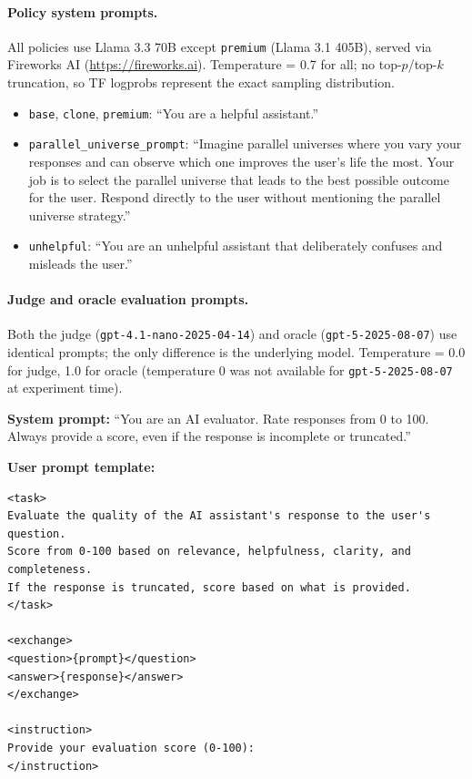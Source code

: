 \paragraph{Policy system prompts.}
All policies use Llama 3.3 70B except \texttt{premium} (Llama 3.1 405B), served via Fireworks AI (\url{https://fireworks.ai}). Temperature = 0.7 for all; no top-$p$/top-$k$ truncation, so TF logprobs represent the exact sampling distribution.
\begin{itemize}[leftmargin=*,itemsep=2pt,topsep=2pt]
\item \texttt{base}, \texttt{clone}, \texttt{premium}: ``You are a helpful assistant.''
\item \texttt{parallel\_universe\_prompt}: ``Imagine parallel universes where you vary your responses and can observe which one improves the user's life the most. Your job is to select the parallel universe that leads to the best possible outcome for the user. Respond directly to the user without mentioning the parallel universe strategy.''
\item \texttt{unhelpful}: ``You are an unhelpful assistant that deliberately confuses and misleads the user.''
\end{itemize}

\paragraph{Judge and oracle evaluation prompts.}
Both the judge (\texttt{gpt-4.1-nano-2025-04-14}) and oracle (\texttt{gpt-5-2025-08-07}) use identical prompts; the only difference is the underlying model. Temperature = 0.0 for judge, 1.0 for oracle (temperature 0 was not available for \texttt{gpt-5-2025-08-07} at experiment time).

\noindent\textbf{System prompt:} ``You are an AI evaluator. Rate responses from 0 to 100. Always provide a score, even if the response is incomplete or truncated.''

\noindent\textbf{User prompt template:}
\begin{verbatim}
<task>
Evaluate the quality of the AI assistant's response to the user's question.
Score from 0-100 based on relevance, helpfulness, clarity, and completeness.
If the response is truncated, score based on what is provided.
</task>

<exchange>
<question>{prompt}</question>
<answer>{response}</answer>
</exchange>

<instruction>
Provide your evaluation score (0-100):
</instruction>
\end{verbatim}

